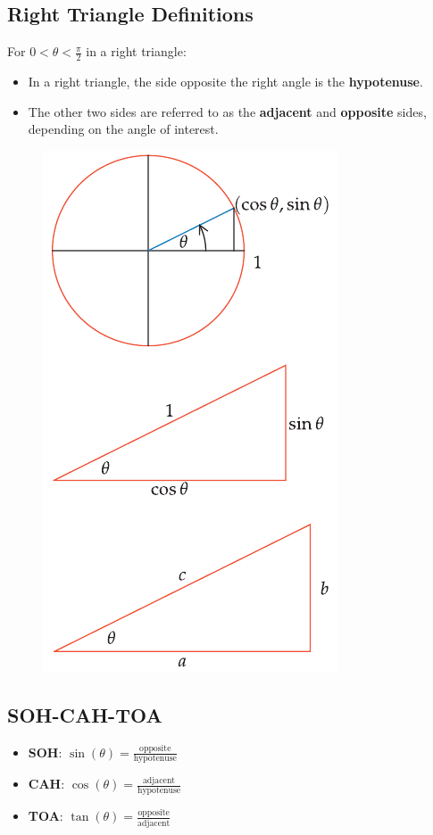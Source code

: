 \subsection{Right Triangle Definitions}
For $0<\theta<\frac{\pi}{2}$ in a right triangle:
\begin{itemize}
    \item In a right triangle, the side opposite the right angle is the \textbf{hypotenuse}.
    \item The other two sides are referred to as the \textbf{adjacent} and \textbf{opposite} sides, depending on the angle of interest.
\end{itemize}
\begin{figure}
    \centering
    \includegraphics[scale=0.3]{pics/13.png}
\end{figure}

\subsection{SOH-CAH-TOA}
\begin{itemize}
    \item \textbf{SOH}: $\sin(\theta) = \frac{\text{opposite}}{\text{hypotenuse}}$
    \item \textbf{CAH}: $\cos(\theta) = \frac{\text{adjacent}}{\text{hypotenuse}}$
    \item \textbf{TOA}: $\tan(\theta) = \frac{\text{opposite}}{\text{adjacent}}$
\end{itemize}

